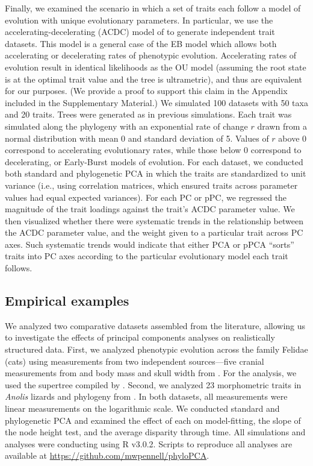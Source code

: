 \documentclass[a4paper,11pt]{article}
\begin{document}
Finally, we examined the scenario in which a set of traits each follow a model of evolution with unique evolutionary parameters. In particular, we use the accelerating-decelerating (ACDC) model of \citet{Blomberg2003} to generate independent trait datasets. This model is a general case of the EB model which allows both accelerating or decelerating rates of phenotypic evolution. Accelerating rates of evolution result in identical likelihoods as the OU model (assuming the root state is at the optimal trait value and the tree is ultrametric), and thus are equivalent for our purposes. (We provide a proof to support this claim in the Appendix included in the Supplementary Material.) We simulated 100 datasets with 50 taxa and 20 traits. Trees were generated as in previous simulations. Each trait was simulated along the phylogeny with an exponential rate of change $r$ drawn from a normal distribution with mean 0 and standard deviation of 5. Values of $r$ above 0 correspond to accelerating evolutionary rates, while those below 0 correspond to decelerating, or Early-Burst models of evolution. For each dataset, we conducted both standard and phylogenetic PCA in which the traits are standardized to unit variance (i.e., using correlation matrices, which ensured traits across parameter values had equal expected variances). For each PC or pPC, we regressed the magnitude of the trait loadings against the trait's ACDC parameter value. We then visualized whether there were systematic trends in the relationship between the ACDC parameter value, and the weight given to a particular trait across PC axes. Such systematic trends would indicate that either PCA or pPCA ``sorts'' traits into PC axes according to the particular evolutionary model each trait follows.

\subsection{Empirical examples}
We analyzed two comparative datasets assembled from the literature, allowing us to investigate the effects of principal components analyses on realistically structured data. First, we analyzed phenotypic evolution across the family Felidae (cats) using measurements from two independent sources---five cranial measurements from \cite{slater_2009} and body mass and skull width from \cite{sakamoto_2010}. For the analysis, we used the supertree compiled by \cite{Nyakatura_2012}. Second, we analyzed 23 morphometric traits in \textit{Anolis} lizards and phylogeny from \cite{Mahler2010}. In both datasets, all measurements were linear measurements on the logarithmic scale. We conducted standard and phylogenetic PCA and examined the effect of each on model-fitting, the slope of the node height test, and the average disparity through time. All simulations and analyses were conducting using R v3.0.2. Scripts to reproduce all analyses are available at \url{https://github.com/mwpennell/phyloPCA}.
  
\end{document}
